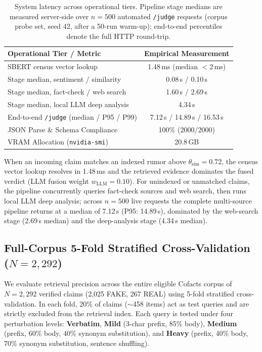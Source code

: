 \documentclass[twoside]{llncs}
\begin{document}
\begin{table}[!htbp]
\caption{System latency across operational tiers. Pipeline stage medians are measured server-side over $n=500$ automated \texttt{/judge} requests (corpus probe set, seed 42, after a 50-run warm-up); end-to-end percentiles denote the full HTTP round-trip.}
\label{tab:latency}
\centering
\begin{tabular}{lc}
\toprule
\textbf{Operational Tier / Metric} & \textbf{Empirical Measurement} \\
\midrule
SBERT census vector lookup & 1.48\,ms (median $<$2\,ms) \\
Stage median, sentiment / similarity & 0.08\,s / 0.10\,s \\
Stage median, fact-check / web search & 1.60\,s / 2.69\,s \\
Stage median, local LLM deep analysis & 4.34\,s \\
End-to-end \texttt{/judge} (median / P95 / P99) & 7.12\,s / 14.89\,s / 16.53\,s \\
JSON Parse \& Schema Compliance & 100\% (2000/2000) \\
VRAM Allocation (\texttt{nvidia-smi}) & 20.8\,GB \\
\bottomrule
\end{tabular}
\end{table}

When an incoming claim matches an indexed rumor above $\theta_{\text{sim}} = 0.72$, the census vector lookup resolves in 1.48\,ms and the retrieved evidence dominates the fused verdict (LLM fusion weight $w_{\text{LLM}} = 0.10$). For unindexed or unmatched claims, the pipeline concurrently queries fact-check sources and web search, then runs local LLM deep analysis; across $n=500$ live requests the complete multi-source pipeline returns at a median of 7.12\,s (P95: 14.89\,s), dominated by the web-search stage (2.69\,s median) and the deep-analysis stage (4.34\,s median).

\subsection{Full-Corpus 5-Fold Stratified Cross-Validation ($N{=}2{,}292$)}
We evaluate retrieval precision across the entire eligible Cofacts corpus of $N=2{,}292$ verified claims (2,025 FAKE, 267 REAL) using 5-fold stratified cross-validation. In each fold, 20\% of claims ($\sim$458 items) act as test queries and are strictly excluded from the retrieval index. Each query is tested under four perturbation levels: \textbf{Verbatim}, \textbf{Mild} (3-char prefix, 85\% body), \textbf{Medium} (prefix, 60\% body, 40\% synonym substitution), and \textbf{Heavy} (prefix, 40\% body, 70\% synonym substitution, sentence shuffling).
\end{document}

